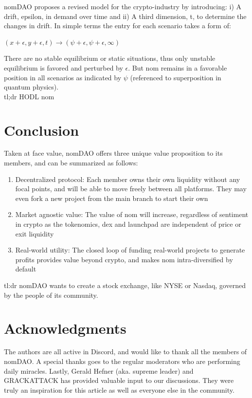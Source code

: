 \documentclass[12pt]{article}
\begin{document}
nomDAO proposes a revised model for the crypto-industry by introducing: i) A drift, epsilon, in demand over time and ii) A third dimension, t, to determine the changes in drift. In simple terms the entry for each scenario takes a form of: 

$(x+\epsilon, y+ \epsilon, t) \rightarrow (\psi+\epsilon, \psi+ \epsilon, \infty)$

There are no stable equilibrium or static situations, thus only unstable equilibrium is favored and perturbed by $\epsilon$. But nom remains in a favorable position in all scenarios as indicated by $\psi$ (referenced to superposition in quantum physics). \\

tl;dr HODL nom

\clearpage


\section*{Conclusion}

Taken at face value, nomDAO offers three unique value proposition to its members, and can be summarized as follows:

\begin{enumerate}

\item Decentralized protocol: Each member owns their own liquidity without any focal points, and will be able to move freely between all platforms. They may even fork a new project from the main branch to start their own

\item Market agnostic value: The value of nom will increase, regardless of sentiment in crypto as the tokenomics, dex and launchpad are independent of price or exit liquidity

\item Real-world utility: The closed loop of funding real-world projects to generate profits provides value beyond crypto, and makes nom intra-diversified by default

\end{enumerate}

tl:dr nomDAO wants to create a stock exchange, like NYSE or Nasdaq, governed by the people of its community.


\clearpage

\section*{Acknowledgments}
The authors are all active in Discord, and would like to thank all the members of nomDAO. A special thanks goes to the regular moderators who are performing daily miracles. Lastly, Gerald Hefner (aka. supreme leader) and GRACKATTACK has provided valuable input to our discussions. They were truly an inspiration for this article as well as everyone else in the community.
\end{document}
